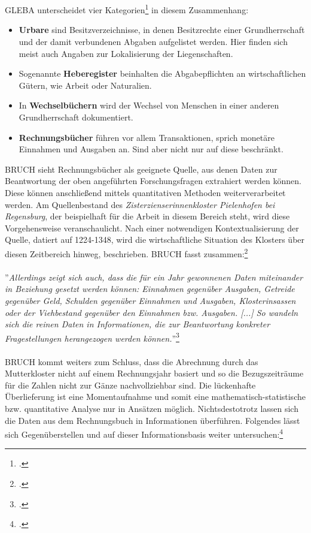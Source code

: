 \documentclass[12pt,a4paper]{article}
\begin{document}
\\
\\
GLEBA unterscheidet vier Kategorien\footcite[][S.51-54]{gleba2016rechnen} in diesem Zusammenhang:
\begin{itemize}
\item \textbf{Urbare} sind Besitzverzeichnisse, in denen Besitzrechte einer Grundherrschaft und der damit verbundenen Abgaben aufgelistet werden. Hier finden sich meist auch Angaben zur Lokalisierung der Liegenschaften.
\item Sogenannte \textbf{Heberegister} beinhalten die Abgabepflichten an wirtschaftlichen Gütern, wie Arbeit oder Naturalien.
\item In \textbf{Wechselbüchern} wird der Wechsel von Menschen in einer anderen Grundherrschaft dokumentiert. 
\item \textbf{Rechnungsbücher} führen vor allem Transaktionen, sprich monetäre Einnahmen und Ausgaben an. Sind aber nicht nur auf diese beschränkt.
\end{itemize}
BRUCH sieht Rechnungsbücher als geeignete Quelle, aus denen Daten zur Beantwortung der oben angeführten Forschungsfragen extrahiert werden können. Diese können anschließend mittels quantitativen Methoden weiterverarbeitet werden. Am Quellenbestand des \textit{Zisterzienserinnenkloster Pielenhofen bei Regensburg}, der beispielhaft für die Arbeit in diesem Bereich steht, wird diese Vorgehensweise veranschaulicht. Nach einer notwendigen Kontextualisierung der Quelle, datiert auf 1224-1348, wird die wirtschaftliche Situation des Klosters über diesen Zeitbereich hinweg, beschrieben. BRUCH fasst zusammen:\footcite[][S.13-37]{bruch2015daten}
\\
\\
''\textit{Allerdings zeigt sich auch, dass die für ein Jahr gewonnenen Daten miteinander in Beziehung gesetzt werden können: Einnahmen gegenüber Ausgaben, Getreide gegenüber Geld, Schulden gegenüber Einnahmen und Ausgaben, Klosterinsassen oder der Viehbestand gegenüber den Einnahmen bzw. Ausgaben. [...] So wandeln sich die reinen Daten in Informationen, die zur Beantwortung konkreter Fragestellungen herangezogen werden können.}''\footcite[][S.37]{bruch2015daten}
\\
\\
BRUCH kommt weiters zum Schluss, dass die Abrechnung durch das Mutterkloster nicht auf einem Rechnungsjahr basiert und so die Bezugszeiträume für die Zahlen nicht zur Gänze nachvollziehbar sind. Die lückenhafte Überlieferung ist eine Momentaufnahme und somit eine mathematisch-statistische bzw. quantitative Analyse nur in Ansätzen möglich. Nichtsdestotrotz lassen sich die Daten aus dem Rechnungsbuch in Informationen überführen. Folgendes lässt sich Gegenüberstellen und auf dieser Informationsbasis weiter untersuchen:\footcite[][S.37-44]{bruch2015daten}
\end{document}
